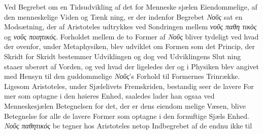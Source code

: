 \documentclass[12pt,a4paper]{book}
\newcommand{\gk}[1]{\textit{#1}}
\begin{document}
Ved Begrebet om en Tidsudvikling af det for Menneske\-%
sjælen Eiendommelige, af den menneskelige Viden og Tænk\-%
ning, er der indenfor Begrebet \gk{Νοῦς} sat en Modsætning, der
af Aristoteles udtrykkes ved Sondringen mellem \gk{νοῦς παθη\-%
τικὸς} og \gk{νοῦς ποιητικός}. Forholdet mellem de to Former af
\gk{Νοῦς} bliver tydeligt ved hvad der ovenfor, under Metaphysiken,
blev udviklet om Formen som det Princip, der Skridt for
Skridt bestemmer Udviklingen og dog ved Udviklingens Slut\-%
ning staaer uberørt af Vorden, og ved hvad der ligeledes der
og i Physiken blev angivet med Hensyn til den guddommelige
\gk{Νοῦς}'s Forhold til Formernes Trinrække. Ligesom Aristoteles,
under Sjælelivets Fremskriden, bestandig seer de lavere For\-%
mer som optagne i den høieres Enhed, saaledes lader han ogsaa
ved Menneskesjælen Betegnelsen for det, der er dens eiendom\-%
melige Væsen, blive Betegnelse for alle de lavere Former som
optagne i den fornuftige Sjæls Enhed. \gk{Νοῦς παθητικός} be\-%
tegner hos Aristoteles netop Indbegrebet af de endnu ikke til
\end{document}
